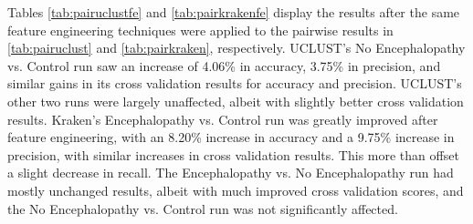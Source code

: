 Tables \ref{tab:pairuclustfe} and \ref{tab:pairkrakenfe} display the results after the same feature engineering techniques were applied to the pairwise results in \ref{tab:pairuclust} and \ref{tab:pairkraken}, respectively. UCLUST's No Encephalopathy vs. Control run saw an increase of 4.06\% in accuracy, 3.75\% in precision, and similar gains in its cross validation results for accuracy and precision. UCLUST's other two runs were largely unaffected, albeit with slightly better cross validation results. Kraken's Encephalopathy vs. Control run was greatly improved after feature engineering, with an 8.20\% increase in accuracy and a 9.75\% increase in precision, with similar increases in cross validation results. This more than offset a slight decrease in recall. The Encephalopathy vs. No Encephalopathy run had mostly unchanged results, albeit with much improved cross validation scores, and the No Encephalopathy vs. Control run was not significantly affected.